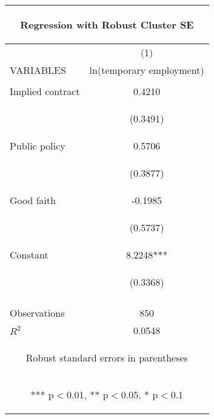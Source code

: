 \begin{center}
\begin{tabular}{lc}
\multicolumn{2}{c}{\begin{large}Regression with Robust Cluster SE\label{2c}\end{large}} \\ \hline
 & (1) \\
VARIABLES & ln(temporary employment) \\ \hline
\vspace{4pt} & \begin{footnotesize}\end{footnotesize} \\
Implied contract & 0.4210 \\
\vspace{4pt} & \begin{footnotesize}(0.3491)\end{footnotesize} \\
Public policy & 0.5706 \\
\vspace{4pt} & \begin{footnotesize}(0.3877)\end{footnotesize} \\
Good faith & -0.1985 \\
\vspace{4pt} & \begin{footnotesize}(0.5737)\end{footnotesize} \\
Constant & 8.2248*** \\
 & \begin{footnotesize}(0.3368)\end{footnotesize} \\
\vspace{4pt} & \begin{footnotesize}\end{footnotesize} \\
Observations & 850 \\
 $R^2$ & 0.0548 \\ \hline
\multicolumn{2}{c}{\begin{footnotesize} Robust standard errors in parentheses\end{footnotesize}} \\
\multicolumn{2}{c}{\begin{footnotesize} *** p$<$0.01, ** p$<$0.05, * p$<$0.1\end{footnotesize}} \\
\end{tabular}
\end{center}
